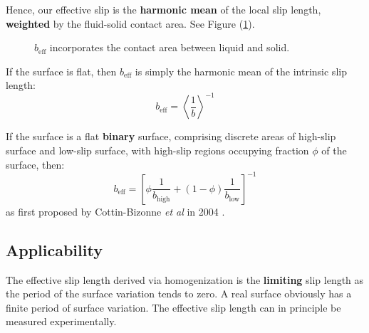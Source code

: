 \documentclass[12pt, a4paper, twoside, openright]{book}
\newcommand{\beff}{\ensuremath{b_{\mathrm{eff}}}}
\begin{document}
Hence, our effective slip is the \textbf{harmonic mean} of the local slip length, \textbf{weighted} by the fluid-solid contact area.  See Figure (\ref{contact}).

\begin{figure}[ht]
\centering
{}
\caption{$\beff$ incorporates the contact area between liquid and solid.}\label{contact}
\end{figure}

If the surface is flat, then $\beff$ is simply the harmonic mean of the intrinsic slip length:
\begin{equation}
\beff = \left< \frac{1}{b} \right> ^{-1}
\end{equation}

If the surface is a flat \textbf{binary} surface, comprising discrete areas of high-slip surface and low-slip surface, with high-slip regions occupying fraction $\phi$ of the surface, then:
\begin{equation}
\beff = \left[ \phi \frac{1}{ b_{\mathrm{high}} }  + (1 -\phi) \frac{1}{ b_{\mathrm{low}}} \right]^{-1}
\end{equation}
as first proposed by Cottin-Bizonne \emph{et al} in 2004 \cite{Cottin-Bizonne2004}.

\clearpage
\subsection{Applicability}

The effective slip length derived via homogenization is the \textbf{limiting} slip length as the period of the surface variation tends to zero.  A real surface obviously has a finite period of surface variation.  The effective slip length can in principle be measured experimentally.  
\end{document}
